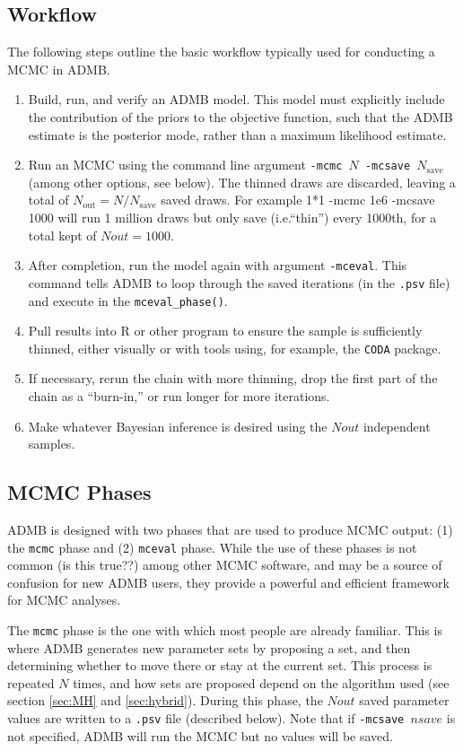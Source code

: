\documentclass{article}\usepackage[]{graphicx}\usepackage[]{color}
\begin{document}
\subsection{Workflow}
The following steps outline the basic workflow typically
used for conducting a MCMC in ADMB.
\begin{enumerate}
\item Build, run, and verify an ADMB model. This model must
  explicitly include the contribution of the priors to the
  objective function, such that the ADMB estimate is the
  posterior mode, rather than a maximum likelihood estimate.
\item Run an MCMC using the command line argument
  \texttt{-mcmc $N$ -mcsave $N_{\text{save}}$} (among other
  options, see below). The thinned draws are discarded,
  leaving a total of $N_{\text{out}}=N/N_{\text{save}}$
  saved draws. For example 1*1 -mcmc 1e6 -mcsave 1000
  will run 1 million draws but only save (i.e.``thin'')
  every 1000th, for a total kept of $Nout=1000$.
\item After completion, run the model again with argument
  \texttt{-mceval}. This command tells ADMB to loop through
  the saved iterations (in the \texttt{.psv} file) and
  execute in the \texttt{mceval\_phase()}.
\item Pull results into R or other program to ensure the
  sample is sufficiently thinned, either visually or with
  tools using, for example, the \texttt{CODA} package.
\item If necessary, rerun the chain with more thinning, drop
  the first part of the chain as a ``burn-in,'' or run
  longer for more iterations.
\item Make whatever Bayesian inference is desired using the
  $Nout$ independent samples.
\end{enumerate}

\subsection{MCMC Phases}
ADMB is designed with two phases that are used to produce
MCMC output: (1) the \texttt{mcmc} phase and (2)
\texttt{mceval} phase. While the use of these phases is not
common (is this true??) among other MCMC software, and may
be a source of confusion for new ADMB users, they provide a
powerful and efficient framework for MCMC analyses.

The \texttt{mcmc} phase is the one with which most people
are already familiar. This is where ADMB generates new
parameter sets by proposing a set, and then determining
whether to move there or stay at the current set. This
process is repeated $N$ times, and how sets are proposed
depend on the algorithm used (see section \ref{sec:MH} and
\ref{sec:hybrid}). During this phase, the $Nout$ saved
parameter values are written to a \texttt{.psv} file
(described below). Note that if \texttt{-mcsave $nsave$} is
not specified, ADMB will run the MCMC but no values will be
saved.
\end{document}
